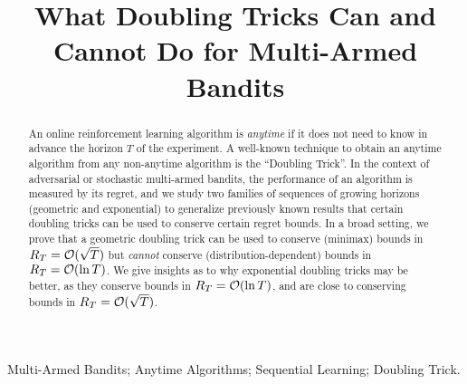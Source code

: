 \documentclass[12pt]{colt2018} %
\title[What Doubling Tricks Can and Cannot Do for Multi-Armed Bandits]{What Doubling Tricks Can and Cannot Do for Multi-Armed Bandits}
\begin{document}
\maketitle


\begin{abstract}
    An online reinforcement learning algorithm is \emph{anytime} if it does not need to know in advance the horizon $T$ of the experiment.
    A well-known technique to obtain an anytime algorithm from any non-anytime algorithm is the ``Doubling Trick''.
    In the context of adversarial or stochastic multi-armed bandits,
    the performance of an algorithm is measured by its regret,
    and we study two families of sequences of growing horizons (geometric and exponential)
    to generalize previously known results that certain doubling tricks can be used to conserve certain regret bounds.
    In a broad setting, we prove that a geometric doubling trick can be used to conserve (minimax) bounds in $R_T = \mathcal{O}(\sqrt{T})$ but \emph{cannot} conserve (distribution-dependent) bounds in $R_T = \mathcal{O}(\ln T)$.
    We give insights as to why exponential doubling tricks may be better, as they conserve bounds in $R_T = \mathcal{O}(\ln T)$, and are close to conserving bounds in $R_T = \mathcal{O}(\sqrt{T})$.

\end{abstract}

\begin{keywords}
    Multi-Armed Bandits;
    Anytime Algorithms;
    Sequential Learning;
    Doubling Trick.
\end{keywords}


\tableofcontents
\end{document}
